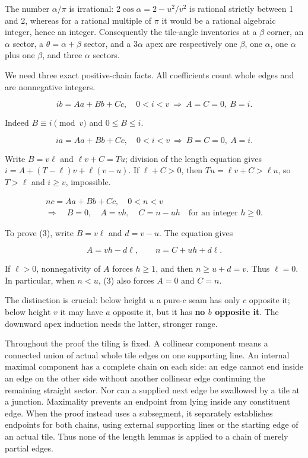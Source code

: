 \documentclass[
  11pt,
  a4paper,
]{article}
\begin{document}
The number \(\alpha/\pi\) is irrational: \(2\cos\alpha=2-u^2/v^2\) is
rational strictly between 1 and 2, whereas for a rational multiple of
\(\pi\) it would be a rational algebraic integer, hence an integer.
Consequently the tile-angle inventories at a \(\beta\) corner, an
\(\alpha\) sector, a \(\theta=\alpha+\beta\) sector, and a \(3\alpha\)
apex are respectively one \(\beta\), one \(\alpha\), one \(\alpha\) plus
one \(\beta\), and three \(\alpha\) sectors.

We need three exact positive-chain facts. All coefficients count whole
edges and are nonnegative integers.

\[
ib=Aa+Bb+Cc,\quad0<i<v
\ \Longrightarrow\ A=C=0,\ B=i. \tag{1}
\]

Indeed \(B\equiv i\pmod v\) and \(0\le B\le i\).

\[
ia=Aa+Bb+Cc,\quad0<i<v
\ \Longrightarrow\ B=C=0,\ A=i. \tag{2}
\]

Write \(B=v\ell\) and \(\ell v+C=T u\); division of the length equation
gives \(i=A+(T-\ell)v+\ell(v-u)\). If \(\ell+C>0\), then
\(Tu=\ell v+C>\ell u\), so \(T>\ell\) and \(i\ge v\), impossible.

\[
\begin{gathered}nc=Aa+Bb+Cc,\quad0<n<v\\
\Longrightarrow\quad B=0,\quad A=vh,\quad C=n-uh\quad\text{for an integer }h\ge0.\end{gathered}\tag{3}
\]

To prove (3), write \(B=v\ell\) and \(d=v-u\). The equation gives

\[
A=vh-d\ell,\qquad n=C+uh+d\ell.
\]

If \(\ell>0\), nonnegativity of \(A\) forces \(h\ge1\), and then
\(n\ge u+d=v\). Thus \(\ell=0\). In particular, when \(n<u\), (3) also
forces \(A=0\) and \(C=n\).

The distinction is crucial: below height \(u\) a pure-\(c\) seam has
only \(c\) opposite it; below height \(v\) it may have \(a\) opposite
it, but it has \textbf{no \(b\) opposite it}. The downward apex
induction needs the latter, stronger range.

Throughout the proof the tiling is fixed. A collinear component means a
connected union of actual whole tile edges on one supporting line. An
internal maximal component has a complete chain on each side: an edge
cannot end inside an edge on the other side without another collinear
edge continuing the remaining straight sector. Nor can a supplied next
edge be swallowed by a tile at a junction. Maximality prevents an
endpoint from lying inside any constituent edge. When the proof instead
uses a subsegment, it separately establishes endpoints for both chains,
using external supporting lines or the starting edge of an actual tile.
Thus none of the length lemmas is applied to a chain of merely partial
edges.
\end{document}
